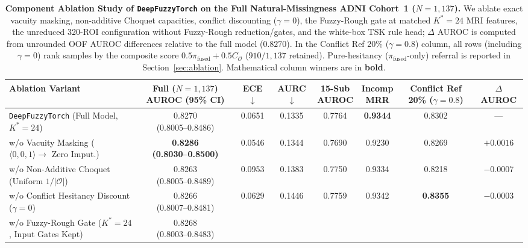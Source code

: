 \documentclass[10pt,twocolumn]{article}
\begin{document}
\begin{table}[t]
\centering
\caption{\textbf{Component Ablation Study of \texttt{DeepFuzzyTorch} on the Full
Natural-Missingness
ADNI Cohort~1 ($N=1,137$).} We ablate exact vacuity masking, non-additive Choquet capacities,
conflict discounting ($\gamma=0$), the Fuzzy-Rough gate at matched $K^*=24$ MRI
features, the unreduced 320-ROI configuration without Fuzzy-Rough reduction/gates, and the
white-box TSK rule head; $\Delta$ AUROC is computed from unrounded OOF AUROC differences
relative to the full model ($0.8270$). In the Conflict Ref 20\% ($\gamma=0.8$) column, all
rows (including $\gamma=0$) rank samples by the composite score $0.5\pi_{\text{fused}} +
0.5 C_{\mathcal{O}}$ ($910/1,137$ retained). Pure-hesitancy ($\pi_{\text{fused}}$-only)
referral is reported in Section~\ref{sec:ablation}. Mathematical column winners are in
\textbf{bold}.}
\label{tab:ablation}
\scriptsize
\setlength{\tabcolsep}{4.0pt}
\begin{tabular}{@{}>{\raggedright\arraybackslash}p{4.8cm}ccccccc@{}}
\toprule
\textbf{Ablation Variant} & \shortstack{\textbf{Full ($N=1,137$)}\\\textbf{AUROC (95\%
CI)}} & \textbf{ECE} $\downarrow$ & \textbf{AURC} $\downarrow$ &
\shortstack{\textbf{15-Sub}\\\textbf{AUROC}} & \shortstack{\textbf{Incomp}\\\textbf{MRR}} &
\shortstack{\textbf{Conflict Ref}\\\textbf{20\%
($\gamma=0.8$)}} & \textbf{$\Delta$ AUROC} \\
\midrule
\texttt{DeepFuzzyTorch} (Full Model, $K^*=24$) & \shortstack{0.8270\\(0.8005--0.8486)} & 0.0651
& 0.1335 & 0.7764 & \textbf{0.9344} & 0.8302 & --- \\
w/o Vacuity Masking ($\langle 0,0,1\rangle \to$ Zero Imput.) &
\shortstack{\textbf{0.8286}\\\textbf{(0.8030--0.8500)}} & 0.0546 & 0.1344 & 0.7690 & 0.9230 &
0.8269 & $+0.0016$ \\
w/o Non-Additive Choquet (Uniform $1/|\mathcal{O}|$) & \shortstack{0.8263\\(0.8005--0.8489)} &
0.0953 & 0.1383 & 0.7750 & 0.9334 & 0.8218 & $-0.0007$ \\
w/o Conflict Hesitancy Discount ($\gamma = 0$) & \shortstack{0.8266\\(0.8007--0.8481)} & 0.0629
& 0.1446 & 0.7759 & 0.9342 & \textbf{0.8355} & $-0.0003$ \\
w/o Fuzzy-Rough Gate ($K^*=24$, Input Gates Kept) & \shortstack{0.8268\\(0.8003--0.8483)} &

\end{tabular}
\end{table}
\end{document}
